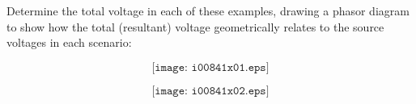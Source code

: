 

Determine the total voltage in each of these examples, drawing a phasor diagram to show how the total (resultant) voltage geometrically relates to the source voltages in each scenario:

$$\texttt{[image: i00841x01.eps]}$$







$$\texttt{[image: i00841x02.eps]}$$










